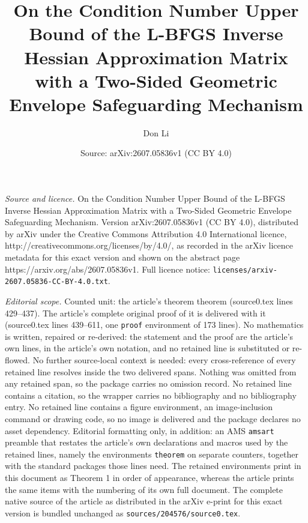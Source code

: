 \documentclass[10pt,a4paper]{amsart}
\title{On the Condition Number Upper Bound of the L-BFGS Inverse Hessian Approximation Matrix with a Two-Sided Geometric Envelope Safeguarding Mechanism}
\author{Don Li}
\date{Source: arXiv:2607.05836v1 (CC BY 4.0)}
\begin{document}
\maketitle

\noindent\emph{Source and licence.} On the Condition Number Upper Bound of the L-BFGS Inverse Hessian Approximation Matrix with a Two-Sided Geometric Envelope Safeguarding Mechanism. Version arXiv:2607.05836v1 (CC BY 4.0), distributed by arXiv under the Creative Commons Attribution 4.0 International licence, http://creativecommons.org/licenses/by/4.0/, as recorded in the arXiv licence metadata for this exact version and shown on the abstract page https://arxiv.org/abs/2607.05836v1. Full licence notice: \texttt{licenses/arxiv-2607.05836-CC-BY-4.0.txt}.\par\smallskip

\noindent\textit{Editorial scope.} Counted unit: the article's theorem theorem (source0.tex lines 429--437). The article's complete original proof of it is delivered with it (source0.tex lines 439--611, one \texttt{proof} environment of 173 lines). No mathematics is written, repaired or re-derived: the statement and the proof are the article's own lines, in the article's own notation, and no retained line is substituted or re-flowed.  No further source-local context is needed: every cross-reference of every retained line resolves inside the two delivered spans.  Nothing was omitted from any retained span, so the package carries no omission record.  No retained line contains a citation, so the wrapper carries no bibliography and no bibliography entry.  No retained line contains a figure environment, an image-inclusion command or drawing code, so no image is delivered and the package declares no asset dependency.  Editorial formatting only, in addition: an AMS \texttt{amsart} preamble that restates the article's own declarations and macros used by the retained lines, namely the environments \texttt{theorem} on separate counters, together with the standard packages those lines need.  The retained environments print in this document as Theorem 1 in order of appearance, whereas the article prints the same items with the numbering of its own full document.  The complete native source of the article as distributed in the arXiv e-print for this exact version is bundled unchanged as \texttt{sources/204576/source0.tex}.
\end{document}
